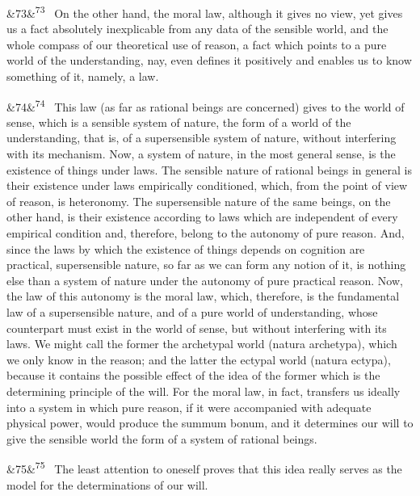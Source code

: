 \documentclass[12pt]{article}
\newcommand{\para}[1][]{\par\noindent\ifx&#1&\else\textsuperscript{\footnotesize #1}~\fi}
\begin{document}
\para[73] On the other hand, the moral law, although it gives no view, yet gives us a fact absolutely inexplicable from any data of the sensible world, and the whole compass of our theoretical use of reason, a fact which points to a pure world of the understanding, nay, even defines it positively and enables us to know something of it, namely, a law.

\para[74] This law (as far as rational beings are concerned) gives to the world of sense, which is a sensible system of nature, the form of a world of the understanding, that is, of a supersensible system of nature, without interfering with its mechanism. Now, a system of nature, in the most general sense, is the existence of things under laws. The sensible nature of rational beings in general is their existence under laws empirically conditioned, which, from the point of view of reason, is heteronomy. The supersensible nature of the same beings, on the other hand, is their existence according to laws which are independent of every empirical condition and, therefore, belong to the autonomy of pure reason. And, since the laws by which the existence of things depends on cognition are practical, supersensible nature, so far as we can form any notion of it, is nothing else than a system of nature under the autonomy of pure practical reason. Now, the law of this autonomy is the moral law, which, therefore, is the fundamental law of a supersensible nature, and of a pure world of understanding, whose counterpart must exist in the world of sense, but without interfering with its laws. We might call the former the archetypal world (natura archetypa), which we only know in the reason; and the latter the ectypal world (natura ectypa), because it contains the possible effect of the idea of the former which is the determining principle of the will. For the moral law, in fact, transfers us ideally into a system in which pure reason, if it were accompanied with adequate physical power, would produce the summum bonum, and it determines our will to give the sensible world the form of a system of rational beings.

\para[75] The least attention to oneself proves that this idea really serves as the model for the determinations of our will.
\end{document}
